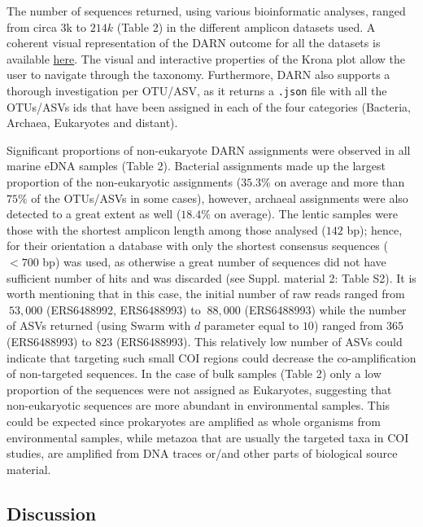    The number of sequences returned, using various bioinformatic analyses, ranged from circa 3k to $214k$ (Table 2) in the different amplicon datasets used. 
   A coherent visual representation of the DARN outcome for all the datasets is 
   available \href{https://hariszaf.github.io/darn/}{here}. 
   The visual and interactive properties of the Krona plot allow the user to navigate through the taxonomy. 
   Furthermore, DARN also supports a thorough investigation per OTU/ASV, as it returns a \texttt{.json} file with 
   all the OTUs/ASVs ids that have been assigned in each of the four categories (Bacteria, Archaea, Eukaryotes and distant).
   
   Significant proportions of non-eukaryote DARN assignments were observed in all marine eDNA samples (Table 2). 
   Bacterial assignments made up the largest proportion of the non-eukaryotic assignments 
   ($35.3\%$ on average and more than $75\%$ of the OTUs/ASVs in some cases), however, archaeal assignments 
   were also detected to a great extent as well ($18.4\%$ on average). 
   The lentic samples were those with the shortest amplicon length among those analysed ($142$ bp); 
   hence, for their orientation a database with only the shortest consensus sequences ($<700$ bp) was used, as otherwise a great number of sequences did not have sufficient number of hits and was discarded (see Suppl. material 2: Table S2). 
   It is worth mentioning that in this case, the initial number of raw reads ranged 
   from $~53,000$ (ERS6488992, ERS6488993) to $~88,000$ (ERS6488993) while the number of ASVs returned 
   (using Swarm with $d$ parameter equal to $10$) ranged from $365$ (ERS6488993) to $823$ (ERS6488993). 
   This relatively low number of ASVs could indicate that targeting such small COI regions could decrease the 
   co-amplification of non-targeted sequences. 
   In the case of bulk samples (Table 2) only a low proportion of the sequences were not assigned as Eukaryotes, suggesting that non-eukaryotic sequences are more abundant in environmental samples. 
   This could be expected since prokaryotes are amplified as whole organisms from environmental samples, while metazoa that are usually the targeted taxa in COI studies, are amplified from DNA traces or/and other parts of biological source material.



   \subsection{Discussion}

